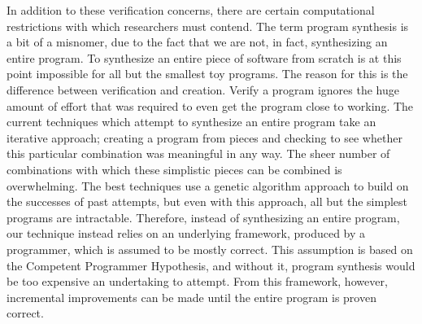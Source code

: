 \documentclass[]{article}
\begin{document}
In addition to these verification concerns, there are certain computational restrictions with which researchers must contend.  The term program synthesis is a bit of a misnomer, due to the fact that we are not, in fact, synthesizing an entire program.  To synthesize an entire piece of software from scratch is at this point impossible for all but the smallest toy programs.  The reason for this is the difference between verification and creation.  Verify a program ignores the huge amount of effort that was required to even get the program close to working.  The current techniques which attempt to synthesize an entire program take an iterative approach; creating a program from pieces and checking to see whether this particular combination was meaningful in any way.  The sheer number of combinations with which these simplistic pieces can be combined is overwhelming.  The best techniques use a genetic algorithm approach to build on the successes of past attempts, but even with this approach, all but the simplest programs are intractable.  Therefore, instead of synthesizing an entire program, our technique instead relies on an underlying framework, produced by a programmer, which is assumed to be mostly correct.  This assumption is based on the Competent Programmer Hypothesis, and without it, program synthesis would be too expensive an undertaking to attempt.  From this framework, however, incremental improvements can be made until the entire program is proven correct.
\end{document}
